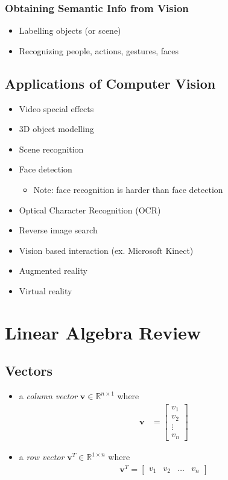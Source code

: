 \documentclass[letterpaper,12pt]{article}
\newcommand{\vect}[1]{\mathbf{#1}}
\begin{document}
\subsubsection{Obtaining Semantic Info from Vision}
\begin{itemize}
 \item Labelling objects (or scene)
 \item Recognizing people, actions, gestures, faces
\end{itemize}

\subsection{Applications of Computer Vision}
\begin{itemize}
 \item Video special effects
 \item 3D object modelling
 \item Scene recognition
 \item Face detection
       \begin{itemize}
        \item Note: face recognition is harder than face detection
       \end{itemize}
 \item Optical Character Recognition (OCR)
 \item Reverse image search
 \item Vision based interaction (ex. Microsoft Kinect)
 \item Augmented reality
 \item Virtual reality
\end{itemize}

\section{Linear Algebra Review}
\subsection{Vectors}
\begin{itemize}
 \item a \textit{column vector} $\vect{v} \in \mathbb{R}^{n \times 1}$ where
       \begin{align}
        \vect{v} & = \begin{bmatrix}
         v_{1}  \\
         v_{2}  \\
         \vdots \\
         v_{n}
        \end{bmatrix}
       \end{align}
 \item a \textit{row vector} $\vect{v}^T \in \mathbb{R}^{1 \times n}$ where
       \begin{align}
        \vect{v}^T = \begin{bmatrix}
         v_1 & v_2 & \dots & v_n
        \end{bmatrix}
       \end{align}
\end{itemize}
\end{document}
